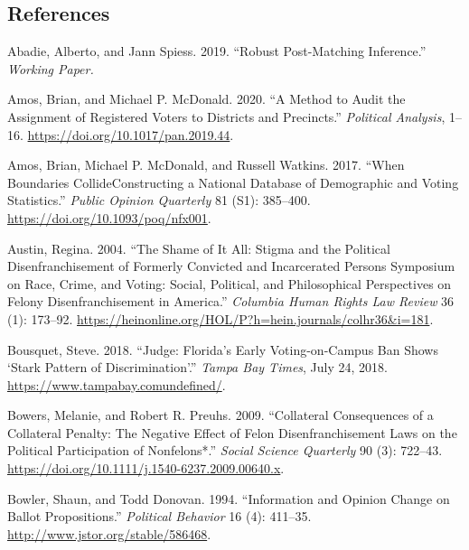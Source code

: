 \documentclass[
  12pt,
]{article}
\newlength{\cslhangindent}
\newenvironment{cslreferences}%
  {\setlength{\parindent}{0pt}%
  \everypar{\setlength{\hangindent}{\cslhangindent}}\ignorespaces}%
  {\par}
\begin{document}
\newpage

\hypertarget{references}{%
\subsection*{References}\label{references}}

\hypertarget{refs}{}
\begin{cslreferences}
\leavevmode\hypertarget{ref-Abadie2019}{}%
Abadie, Alberto, and Jann Spiess. 2019. ``Robust Post-Matching Inference.'' \emph{Working Paper.}

\leavevmode\hypertarget{ref-Amos2020}{}%
Amos, Brian, and Michael P. McDonald. 2020. ``A Method to Audit the Assignment of Registered Voters to Districts and Precincts.'' \emph{Political Analysis}, 1--16. \url{https://doi.org/10.1017/pan.2019.44}.

\leavevmode\hypertarget{ref-Amos2017}{}%
Amos, Brian, Michael P. McDonald, and Russell Watkins. 2017. ``When Boundaries CollideConstructing a National Database of Demographic and Voting Statistics.'' \emph{Public Opinion Quarterly} 81 (S1): 385--400. \url{https://doi.org/10.1093/poq/nfx001}.

\leavevmode\hypertarget{ref-Austin2004}{}%
Austin, Regina. 2004. ``The Shame of It All: Stigma and the Political Disenfranchisement of Formerly Convicted and Incarcerated Persons Symposium on Race, Crime, and Voting: Social, Political, and Philosophical Perspectives on Felony Disenfranchisement in America.'' \emph{Columbia Human Rights Law Review} 36 (1): 173--92. \url{https://heinonline.org/HOL/P?h=hein.journals/colhr36\&i=181}.

\leavevmode\hypertarget{ref-Bousquet2018a}{}%
Bousquet, Steve. 2018. ``Judge: Florida's Early Voting-on-Campus Ban Shows `Stark Pattern of Discrimination'.'' \emph{Tampa Bay Times}, July 24, 2018. \url{https://www.tampabay.comundefined/}.

\leavevmode\hypertarget{ref-Bowers2009}{}%
Bowers, Melanie, and Robert R. Preuhs. 2009. ``Collateral Consequences of a Collateral Penalty: The Negative Effect of Felon Disenfranchisement Laws on the Political Participation of Nonfelons*.'' \emph{Social Science Quarterly} 90 (3): 722--43. \url{https://doi.org/10.1111/j.1540-6237.2009.00640.x}.

\leavevmode\hypertarget{ref-Bowler1994}{}%
Bowler, Shaun, and Todd Donovan. 1994. ``Information and Opinion Change on Ballot Propositions.'' \emph{Political Behavior} 16 (4): 411--35. \url{http://www.jstor.org/stable/586468}.


\end{cslreferences}
\end{document}
